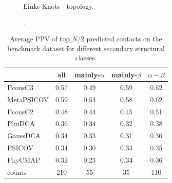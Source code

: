 \documentclass[a4,center,fleqn]{NAR}
\begin{document}
\begin{figure}[t]
\begin{center}
\end{center}
\caption{Links Knots - topology.}
\label{fig:Interface}
\end{figure}


\begin{figure}[t]
\begin{center}
\end{center}
\caption{.}
\label{fig:exampel PF0009.24}
\end{figure}


\begin{table}[t!]
\centering
\caption{Average PPV of top $N/2$ predicted contacts on the benchmark dataset for different secondary structural classes. \label{tab:ss}}
{\begin{tabular}{lcccc}
  \hline
 & all & mainly-$\alpha$ & mainly-$\beta$ & $\alpha-\beta$ \\ 
  \hline
  PconsC3 & 0.57 & 0.49 & 0.59 & 0.62 \\ 
    MetaPSICOV & 0.59 & 0.54 & 0.58 & 0.62 \\ 
    PconsC2 & 0.48 & 0.44 & 0.45 & 0.51 \\ 
    PlmDCA & 0.36 & 0.34 & 0.32 & 0.38 \\ 
    GaussDCA & 0.34 & 0.33 & 0.31 & 0.36 \\ 
    PSICOV & 0.34 & 0.30 & 0.33 & 0.35 \\ 
    PhyCMAP & 0.32 & 0.23 & 0.34 & 0.36 \\ 
   \hline
  counts & 210 & 55 & 35 & 110 \\
   \hline
\end{tabular}}{}
\end{table}
\end{document}
